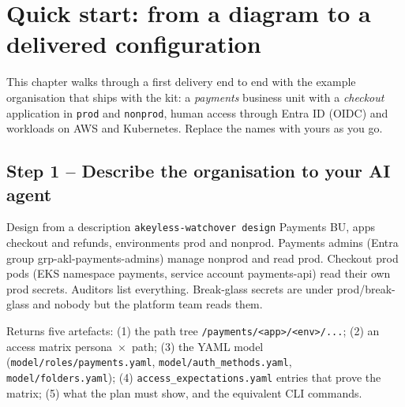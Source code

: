 \chapter{Quick start: from a diagram to a delivered configuration}\label{ch:quickstart}

This chapter walks through a first delivery end to end with the example organisation that ships
with the kit: a \emph{payments} business unit with a \emph{checkout} application in
\texttt{prod} and \texttt{nonprod}, human access through Entra ID (OIDC) and workloads on AWS and
Kubernetes. Replace the names with yours as you go.

\section{Step 1 -- Describe the organisation to your AI agent}
\begin{session}{Design from a description}
\you \texttt{akeyless-watchover design} Payments BU, apps checkout and refunds, environments prod
and nonprod. Payments admins (Entra group grp-akl-payments-admins) manage nonprod and read prod.
Checkout prod pods (EKS namespace payments, service account payments-api) read their own prod
secrets. Auditors list everything. Break-glass secrets are under prod/break-glass and nobody
but the platform team reads them.

\agent Returns five artefacts: (1) the path tree
\texttt{/payments/<app>/<env>/...}; (2) an access matrix persona~$\times$~path; (3) the YAML model
(\texttt{model/roles/payments.yaml}, \texttt{model/auth\_methods.yaml}, \texttt{model/folders.yaml});
(4) \texttt{access\_expectations.yaml} entries that prove the matrix; (5) what the plan must show,
and the equivalent CLI commands.
\end{session}

